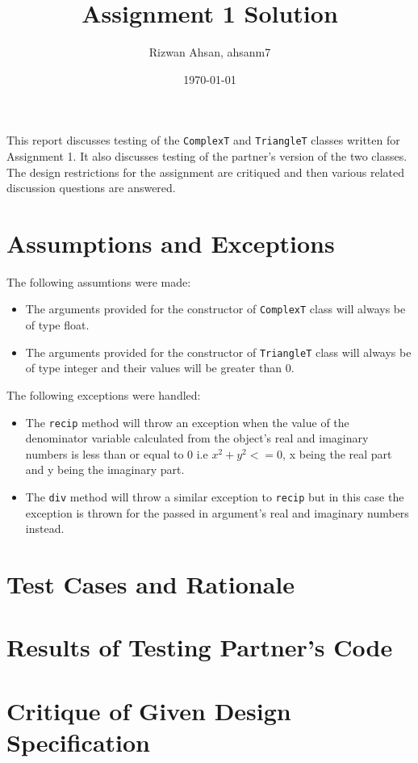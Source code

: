 \documentclass[12pt]{article}
\title{Assignment 1 Solution}
\author{Rizwan Ahsan, ahsanm7}
\date{\today}
\begin{document}
\maketitle

This report discusses testing of the \verb|ComplexT| and \verb|TriangleT|
classes written for Assignment 1. It also discusses testing of the partner's
version of the two classes. The design restrictions for the assignment
are critiqued and then various related discussion questions are answered.

\section{Assumptions and Exceptions} \label{AssumptAndExcept}
The following assumtions were made:
\begin{itemize}
	\item The arguments provided for the constructor of \verb|ComplexT| class will always be of 
	type float.
	\item The arguments provided for the constructor of \verb|TriangleT| class will always be of type integer and their values will be greater than 0.
\end{itemize}
The following exceptions were handled:
\begin{itemize}
	\item The \verb|recip| method will throw an exception when the value of the denominator variable calculated from the object's real and imaginary numbers is less than or equal 
	to 0 i.e \(x^2 + y^2 <= 0\), x being the real part and y being the imaginary part.
	\item The \verb|div| method will throw a similar exception to \verb|recip| but in this case
	the exception is thrown for the passed in argument's real and imaginary numbers instead.
\end{itemize}


\section{Test Cases and Rationale} \label{Testing}


\section{Results of Testing Partner's Code}


\section{Critique of Given Design Specification}
\end{document}
